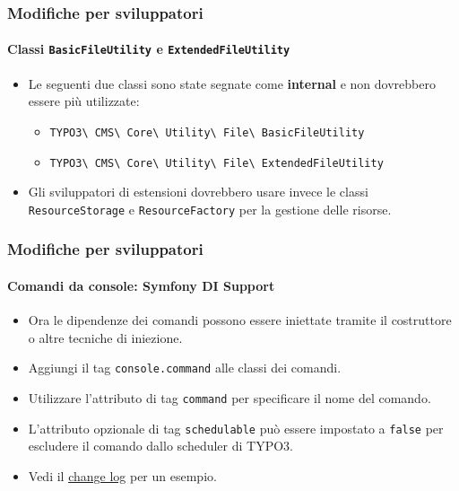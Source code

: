 \begin{frame}[fragile]
	\frametitle{Modifiche per sviluppatori}
	\framesubtitle{Classi \texttt{BasicFileUtility} e \texttt{ExtendedFileUtility}}

	\begin{itemize}
		\item Le seguenti due classi sono state segnate come \textbf{internal}
			e non dovrebbero essere più utilizzate:

			\begin{itemize}\small
				\item \texttt{TYPO3\textbackslash
					CMS\textbackslash
					Core\textbackslash
					Utility\textbackslash
					File\textbackslash
					BasicFileUtility}
				\item \texttt{TYPO3\textbackslash
					CMS\textbackslash
					Core\textbackslash
					Utility\textbackslash
					File\textbackslash
					ExtendedFileUtility}
			\end{itemize}

		\item Gli sviluppatori di estensioni dovrebbero usare invece le classi \texttt{ResourceStorage}
			e \texttt{ResourceFactory} per la gestione delle risorse.

	\end{itemize}

\end{frame}


\begin{frame}[fragile]
	\frametitle{Modifiche per sviluppatori}
	\framesubtitle{Comandi da console: Symfony DI Support}

	\begin{itemize}
		\item Ora le dipendenze dei comandi possono essere iniettate tramite il costruttore o altre tecniche di iniezione.
		\item Aggiungi il tag \texttt{console.command} alle classi dei comandi.
		\item Utilizzare l'attributo di tag \texttt{command} per specificare il nome del comando.
		\item L'attributo opzionale di tag \texttt{schedulable} può essere impostato a \texttt{false}
			per escludere il comando dallo scheduler di TYPO3.

		\item Vedi il
			\href{https://docs.typo3.org/c/typo3/cms-core/master/en-us/Changelog/10.3/Feature-89139-AddDependencyInjectionSupportForConsoleCommands.html}{change log}
			per un esempio.
	\end{itemize}

\end{frame}

